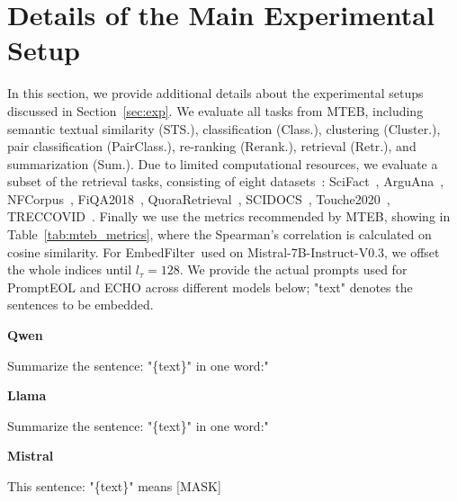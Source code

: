 \documentclass{llmxive}
\providecommand{\name}{EmbedFilter}
\begin{document}

\balance



\appendix




\section{Details of the Main Experimental Setup}
\label{sec:main_setup}
In this section, we provide additional details about the experimental setups discussed in Section~\ref{sec:exp}.
We evaluate all tasks from MTEB, including semantic textual similarity (STS.), classification (Class.), clustering (Cluster.), pair classification (PairClass.), re-ranking (Rerank.), retrieval (Retr.), and summarization (Sum.). 
Due to limited computational resources, we evaluate a subset of the retrieval tasks, consisting of eight datasets~\cite{mteb}: SciFact~\cite{scifact}, ArguAna~\cite{arguana}, NFCorpus~\cite{Nfcorpus}, FiQA2018~\cite{fiqa}, QuoraRetrieval~\cite{beir}, SCIDOCS~\cite{scidocs}, Touche2020~\cite{touche}, TRECCOVID~\cite{treccovid}. 
Finally we use the metrics recommended by MTEB, showing in Table~\ref{tab:mteb_metrics}, where the Spearman’s correlation is calculated on cosine similarity. 
For \name\ used on Mistral-7B-Instruct-V0.3, we offset the whole indices until \(l_\tau=128\).
We provide the actual prompts used for PromptEOL and ECHO across different models below; "text" denotes the sentences to be embedded.
\begin{tcolorbox}[
    colback=white,
    arc=0mm,
    title=PromptEOL,
    boxrule=0.5pt, %
    left = 0mm, right = 0mm,
    top=1mm, bottom=1mm
]
    \label{box:PromptEOL}
    \textbf{Qwen}
    \begin{tcolorbox}[colback=black!3, boxrule=0.2pt, arc=1mm, top=0.2mm, bottom=0.2mm, left = 0mm, right = 0mm, before skip=2mm, after skip=2mm]
        Summarize the sentence: "\{text\}" in one word:"
    \end{tcolorbox}

    \textbf{Llama}
    \begin{tcolorbox}[colback=black!3, boxrule=0.2pt, arc=1mm, top=0.2mm, bottom=0.2mm, left = 0mm, right = 0mm, before skip=2mm, after skip=2mm]
        Summarize the sentence: "\{text\}" in one word:"
    \end{tcolorbox}
    
    \textbf{Mistral}
    \begin{tcolorbox}[colback=black!3, boxrule=0.2pt, arc=1mm, top=0.2mm, bottom=0.2mm, left = 0mm, right = 0mm, before skip=2mm, after skip=2mm]
        This sentence: "\{text\}" means [MASK]
    \end{tcolorbox}
\end{tcolorbox}
\end{document}
